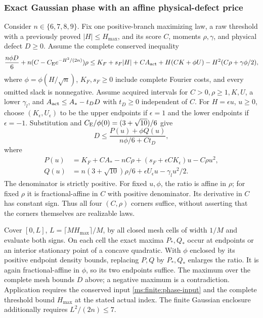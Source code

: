 \subsubsection{Exact Gaussian phase with an affine physical-defect price}
\label{ms:finite:exact-phase}
Consider $n\in\{6,7,8,9\}$. Fix one positive-branch
maximizing law, a raw threshold with a previously proved
$|H|\le H_{\max}$, and its score $C$, moments $\rho,\gamma$, and
physical defect $D\ge0$. Assume the complete conserved inequality
\begin{align}
 \frac{n\phi D}{6}+n(C-C_{\mathrm E} e^{-H^2/(2n)})\rho
 \le K_F+s_F|H|+C A_{\rm act}
 +H(CK+\phi U)-H^2(C\rho+\gamma\phi/2),
 \label{ms:finite:phase-input}
\end{align}
where $\phi=\phi(H/\sqrt n)$, $K_F,s_F\ge0$ include complete
Fourier costs, and every omitted slack is nonnegative. Assume acquired
intervals for $C>0,\rho\ge1,K,U$, a lower $\gamma_l$, and
$A_{\rm act}\le A_*-t_DD$ with $t_D\ge0$ independent of $C$.
For $H=\epsilon u$, $u\ge0$, choose $(K_\epsilon,U_\epsilon)$ to
be the upper endpoints if $\epsilon=1$ and the lower endpoints if
$\epsilon=-1$. Substitution and $C_{\mathrm E}/\phi(0)=(3+\sqrt{10})/6$ give
\begin{equation}
 D\le\frac{P(u)+\phi Q(u)}{n\phi/6+Ct_D},
 \label{ms:finite:phase-ratio}
\end{equation}
where
\begin{align*}
 P(u)&=K_F+CA_*-nC\rho+(s_F+\epsilon CK_\epsilon)u-C\rho u^2,\\
 Q(u)&=n(3+\sqrt{10})\rho/6+\epsilon U_\epsilon u-\gamma_lu^2/2.
\end{align*}
The denominator is strictly positive. For fixed $u,\phi$, the ratio
is affine in $\rho$; for fixed $\rho$ it is fractional-affine in
$C$ with positive denominator. Its derivative in $C$ has constant
sign. Thus all four $(C,\rho)$ corners suffice, without asserting that
the corners themselves are realizable laws.

Cover $[0,L]$, $L=\lceil MH_{\max}\rceil/M$, by all closed mesh
cells of width $1/M$ and evaluate both signs. On each cell the exact
maxima $P_*,Q_*$ occur at endpoints or an interior stationary point
of a concave quadratic. With $\phi$ enclosed by its positive endpoint
density bounds, replacing $P,Q$ by $P_*,Q_*$ enlarges the ratio.
It is again fractional-affine in $\phi$, so its two endpoints suffice.
The maximum over the complete mesh bounds $D$ above; a negative
maximum is a contradiction. Application requires the conserved input \eqref{ms:finite:phase-input}
and the complete threshold bound $H_{\max}$ at the stated actual index.
The finite Gaussian enclosure additionally requires $L^2/(2n)\le7$.

